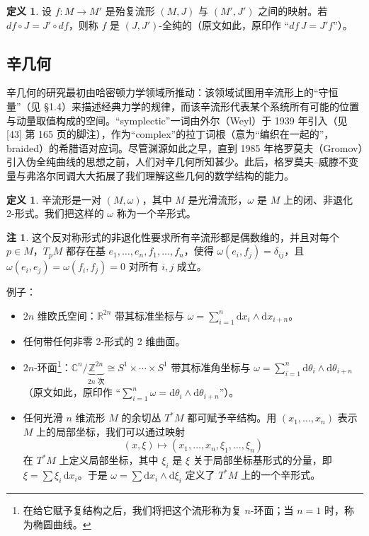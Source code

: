 \documentclass[11pt,a4paper]{article}
\theoremstyle{plain}
\theoremstyle{definition}
\newtheorem{definition}[theorem]{定义}
\newtheorem{remark}[theorem]{注}
\begin{document}
\begin{definition}
设 $f\colon M\to M'$ 是殆复流形 $(M,J)$ 与 $(M',J')$ 之间的映射。若 $df\circ J=J'\circ df$，则称 $f$ 是 $(J,J')$-全纯的（原文如此，原印作 “$df\,J=J'f$”）。
\end{definition}

\subsection{辛几何}

辛几何的研究最初由哈密顿力学领域所推动：该领域试图用辛流形上的“守恒量”（见 §1.4）来描述经典力学的规律，而该辛流形代表某个系统所有可能的位置与动量取值构成的空间。“symplectic”一词由外尔（Weyl）于 1939 年引入（见 [43] 第 165 页的脚注），作为“complex”的拉丁词根（意为“编织在一起的”，braided）的希腊语对应词。尽管渊源如此之早，直到 1985 年格罗莫夫（Gromov）引入伪全纯曲线的思想之前，人们对辛几何所知甚少。此后，格罗莫夫–威滕不变量与弗洛尔同调大大拓展了我们理解这些几何的数学结构的能力。

\begin{definition}
辛流形是一对 $(M,\omega)$，其中 $M$ 是光滑流形，$\omega$ 是 $M$ 上的闭、非退化 2-形式。我们把这样的 $\omega$ 称为一个辛形式。
\end{definition}

\begin{remark}
这个反对称形式的非退化性要求所有辛流形都是偶数维的，并且对每个 $p\in M$，$T_pM$ 都存在基 $e_1,\ldots,e_n,f_1,\ldots,f_n$，使得 $\omega(e_i,f_j)=\delta_{ij}$，且 $\omega(e_i,e_j)=\omega(f_i,f_j)=0$ 对所有 $i,j$ 成立。
\end{remark}

例子：
\begin{itemize}
  \item $2n$ 维欧氏空间：$\mathbb{R}^{2n}$ 带其标准坐标与 $\omega=\sum_{i=1}^n\mathrm{d}x_i\wedge\mathrm{d}x_{i+n}$。
  \item 任何带任何非零 2-形式的 2 维曲面。
  \item $2n$-环面\footnote{在给它赋予复结构之后，我们将把这个流形称为复 $n$-环面；当 $n=1$ 时，称为椭圆曲线。}：$\mathbb{C}^n/\underbrace{\mathbb{Z}^{2n}}_{2n\text{ 次}}\cong S^1\times\cdots\times S^1$ 带其标准角坐标与 $\omega=\sum_{i=1}^n\mathrm{d}\theta_i\wedge\mathrm{d}\theta_{i+n}$（原文如此，原印作 “$\sum_{i=1}^n\omega=\mathrm{d}\theta_i\wedge\mathrm{d}\theta_{i+n}$”）。
  \item 任何光滑 $n$ 维流形 $M$ 的余切丛 $T^*M$ 都可赋予辛结构。用 $(x_1,\ldots,x_n)$ 表示 $M$ 上的局部坐标，我们可以通过映射
\[
(x,\xi)\mapsto (x_1,\ldots,x_n,\xi_1,\ldots,\xi_n)
\]
在 $T^*M$ 上定义局部坐标，其中 $\xi_i$ 是 $\xi$ 关于局部坐标基形式的分量，即 $\xi=\sum\xi_i\,\mathrm{d}x_i$。于是 $\omega=\sum\mathrm{d}x_i\wedge\mathrm{d}\xi_i$ 定义了 $T^*M$ 上的一个辛形式。
\end{itemize}
\end{document}
